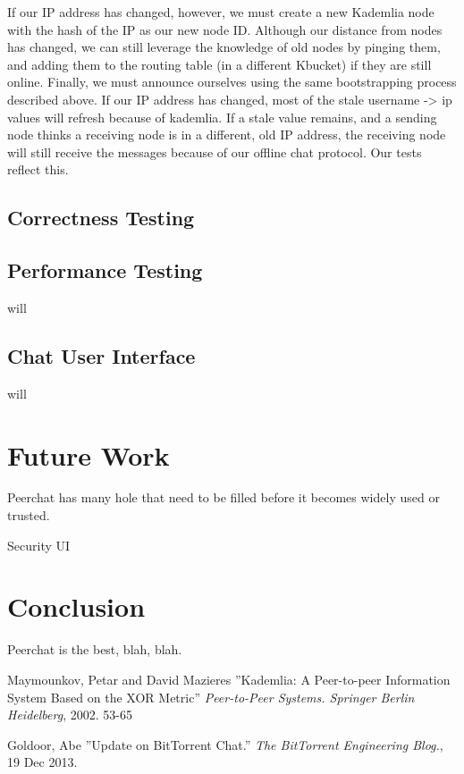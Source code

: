 \documentclass{article}
\begin{document}
If our IP address has changed, however, we must create a new Kademlia node with the hash of the IP as our new node ID. Although our distance from nodes has changed, we can still leverage the knowledge of old nodes by pinging them, and adding them to the routing table (in a different Kbucket)  if they are still online. Finally, we must announce ourselves using the same bootstrapping process described above. If our IP address has changed, most of the stale username -> ip values will refresh because of kademlia. If a stale value remains, and a sending node thinks a receiving node is in a different, old IP address, the receiving node will still receive the messages because of our offline chat protocol. Our tests reflect this. 

\subsection{Correctness Testing}
\subsection{Performance Testing}

will

\subsection{Chat User Interface}

will

\section{Future Work}

Peerchat has many hole that need to be filled before it becomes widely used or trusted. 

Security
UI

\section{Conclusion}

Peerchat is the best, blah, blah.

\begin{thebibliography}{99}
   Maymounkov, Petar and David Mazieres
   ''Kademlia: A Peer-to-peer Information System Based on the XOR Metric''
   \textit{Peer-to-Peer Systems. Springer Berlin Heidelberg}, 2002. 53-65

	Goldoor, Abe
	''Update on BitTorrent Chat.''
	\textit{The BitTorrent Engineering Blog.}, 19 Dec 2013.

\end{thebibliography}
\end{document}
